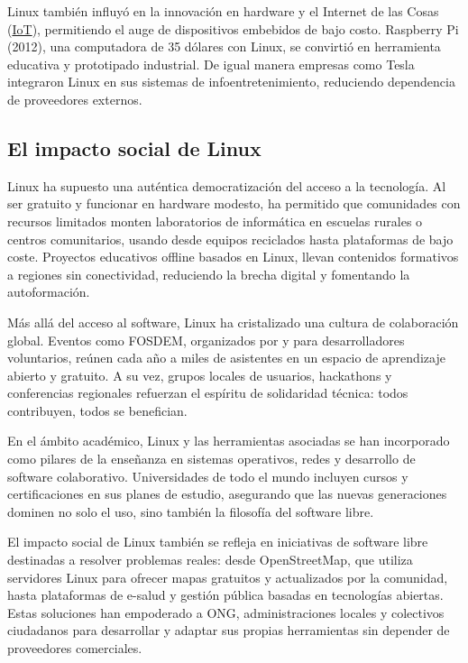 \documentclass[a4paper,12pt]{article}
\begin{document}
Linux también influyó en la innovación en hardware y el Internet de las Cosas
(\hyperlink{iot}{IoT}), permitiendo el auge de dispositivos embebidos de bajo costo. Raspberry Pi
(2012), una computadora de 35 dólares con Linux, se convirtió en herramienta
educativa y prototipado industrial. De igual manera empresas como Tesla
integraron Linux en sus sistemas de infoentretenimiento, reduciendo dependencia
de proveedores externos. 

\subsection{El impacto social de Linux}

Linux ha supuesto una auténtica democratización del acceso a la tecnología. Al
ser gratuito y funcionar en hardware modesto, ha permitido que comunidades con
recursos limitados monten laboratorios de informática en escuelas rurales o
centros comunitarios, usando desde equipos reciclados hasta plataformas de bajo
coste. Proyectos educativos offline basados en Linux, llevan contenidos
formativos a regiones sin conectividad, reduciendo la brecha digital y 
fomentando la autoformación.

Más allá del acceso al software, Linux ha cristalizado una cultura de
colaboración global.  Eventos como FOSDEM, organizados por y para
desarrolladores voluntarios, reúnen cada año a miles de asistentes en un espacio
de aprendizaje abierto y gratuito. A su vez, grupos locales de usuarios,
hackathons y conferencias regionales refuerzan el espíritu de solidaridad
técnica: todos contribuyen, todos se benefician.

En el ámbito académico, Linux y las herramientas asociadas se han incorporado
como pilares de la enseñanza en sistemas operativos, redes y desarrollo de
software colaborativo. Universidades de todo el mundo incluyen cursos y
certificaciones en sus planes de estudio, asegurando que las nuevas generaciones
dominen no solo el uso, sino también la filosofía del software libre.

El impacto social de Linux también se refleja en iniciativas de software libre
destinadas a resolver problemas reales: desde OpenStreetMap, que utiliza
servidores Linux para ofrecer mapas gratuitos y actualizados por la comunidad,
hasta plataformas de e-salud y gestión pública basadas en tecnologías abiertas.
Estas soluciones han empoderado a ONG, administraciones locales y colectivos 
ciudadanos para desarrollar y adaptar sus propias herramientas sin depender de
proveedores comerciales.
\end{document}
